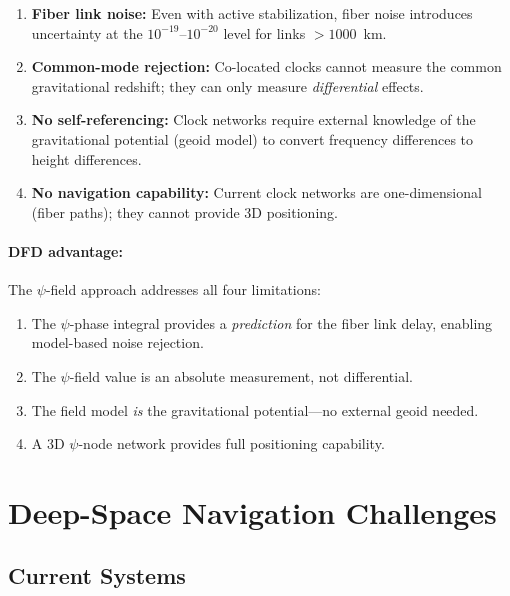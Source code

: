 \documentclass[12pt,letterpaper]{article}
\begin{document}
\begin{enumerate}
\item \textbf{Fiber link noise:} Even with active stabilization, fiber
noise introduces uncertainty at the $10^{-19}$--$10^{-20}$ level for
links $> 1000$~km.
\item \textbf{Common-mode rejection:} Co-located clocks cannot measure
the common gravitational redshift; they can only measure
\emph{differential} effects.
\item \textbf{No self-referencing:} Clock networks require external
knowledge of the gravitational potential (geoid model) to convert
frequency differences to height differences.
\item \textbf{No navigation capability:} Current clock networks are
one-dimensional (fiber paths); they cannot provide 3D positioning.
\end{enumerate}

\paragraph{DFD advantage:}
The $\psi$-field approach addresses all four limitations:
\begin{enumerate}
\item The $\psi$-phase integral provides a \emph{prediction} for the
fiber link delay, enabling model-based noise rejection.
\item The $\psi$-field value is an absolute measurement, not differential.
\item The field model \emph{is} the gravitational potential---no external
geoid needed.
\item A 3D $\psi$-node network provides full positioning capability.
\end{enumerate}

\section{Deep-Space Navigation Challenges}

\subsection{Current Systems}
\end{document}
